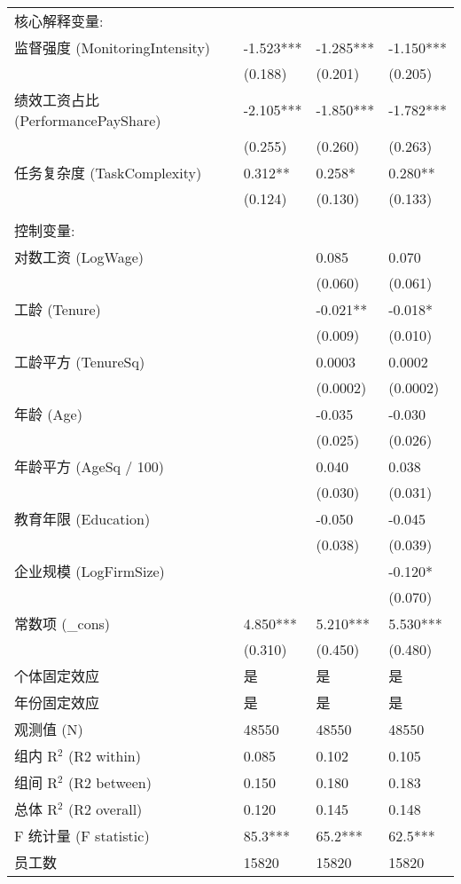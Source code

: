 {\begin{longtable}{p{5cm} p{2.2cm} p{2.2cm} p{2.2cm}}
{核心解释变量:} & & & \\
\quad 监督强度 (MonitoringIntensity) & -1.523*** & -1.285*** & -1.150*** \\
& (0.188) & (0.201) & (0.205) \\
\quad 绩效工资占比 (PerformancePayShare) & -2.105*** & -1.850*** & -1.782*** \\
& (0.255) & (0.260) & (0.263) \\
\quad 任务复杂度 (TaskComplexity) & 0.312** & 0.258* & 0.280** \\
& (0.124) & (0.130) & (0.133) \\
\\ %
{控制变量:} & & & \\
\quad 对数工资 (LogWage) & & 0.085 & 0.070 \\
& & (0.060) & (0.061) \\
\quad 工龄 (Tenure) & & -0.021** & -0.018* \\
& & (0.009) & (0.010) \\
\quad 工龄平方 (TenureSq) & & 0.0003 & 0.0002 \\
& & (0.0002) & (0.0002) \\
\quad 年龄 (Age) & & -0.035 & -0.030 \\
& & (0.025) & (0.026) \\
\quad 年龄平方 (AgeSq / 100) & & 0.040 & 0.038 \\
& & (0.030) & (0.031) \\
\quad 教育年限 (Education) & & -0.050 & -0.045 \\
& & (0.038) & (0.039) \\
\quad 企业规模 (LogFirmSize) & & & -0.120* \\
& & & (0.070) \\
\quad 常数项 (\_cons) & 4.850*** & 5.210*** & 5.530*** \\
& (0.310) & (0.450) & (0.480) \\
\midrule %
个体固定效应 & 是 & 是 & 是 \\
年份固定效应 & 是 & 是 & 是 \\
\midrule %
观测值 (N) & 48550 & 48550 & 48550 \\
组内 R$^2$ (R2 within) & 0.085 & 0.102 & 0.105 \\
组间 R$^2$ (R2 between) & 0.150 & 0.180 & 0.183 \\
总体 R$^2$ (R2 overall) & 0.120 & 0.145 & 0.148 \\
F 统计量 (F statistic) & 85.3*** & 65.2*** & 62.5*** \\
员工数 & 15820 & 15820 & 15820 \\

\end{longtable}
} %

